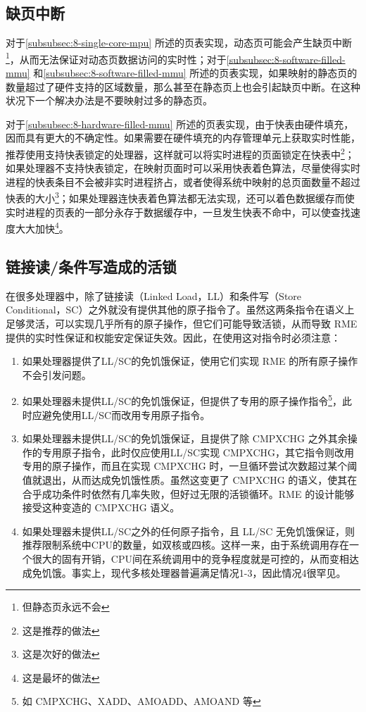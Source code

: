 \subsection{缺页中断}\label{subsec:9-page-faults}

对于\ref{subsubsec:8-single-core-mpu}
所述的页表实现，动态页可能会产生缺页中断\footnote{但静态页永远不会}，从而无法保证对动态页数据访问的实时性；对于\ref{subsubsec:8-software-filled-mmu}
和\ref{subsubsec:8-software-filled-mmu}
所述的页表实现，如果映射的静态页的数量超过了硬件支持的区域数量，那么甚至在静态页上也会引起缺页中断。在这种状况下一个解决办法是不要映射过多的静态页。

对于\ref{subsubsec:8-hardware-filled-mmu}
所述的页表实现，由于快表由硬件填充，因而具有更大的不确定性。如果需要在硬件填充的内存管理单元上获取实时性能，推荐使用支持快表锁定的处理器，这样就可以将实时进程的页面锁定在快表中\footnote{这是推荐的做法}；如果处理器不支持快表锁定，在映射页面时可以采用快表着色算法，尽量使得实时进程的快表条目不会被非实时进程挤占，或者使得系统中映射的总页面数量不超过快表的大小\footnote{这是次好的做法}；如果处理器连快表着色算法都无法实现，还可以着色数据缓存而使实时进程的页表的一部分永存于数据缓存中，一旦发生快表不命中，可以使查找速度大大加快\footnote{这是最坏的做法}。

\subsection{链接读/条件写造成的活锁}\label{subsec:9-ll-sc-livelock}

在很多处理器中，除了链接读（Linked Load，LL）和条件写（Store
Conditional，SC）之外就没有提供其他的原子指令了。虽然这两条指令在语义上足够灵活，可以实现几乎所有的原子操作，但它们可能导致活锁，从而导致 RME 提供的实时性保证和权能安定保证失效。因此，在使用这对指令时必须注意：

\begin{enumerate}
\def\labelenumi{\arabic{enumi}.}
\item
  如果处理器提供了LL/SC的免饥饿保证，使用它们实现 RME 的所有原子操作不会引发问题。
\item
  如果处理器未提供LL/SC的免饥饿保证，但提供了专用的原子操作指令\footnote{如 CMPXCHG、XADD、AMOADD、AMOAND 等}，此时应避免使用LL/SC而改用专用原子指令。
\item
  如果处理器未提供LL/SC的免饥饿保证，且提供了除 CMPXCHG 之外其余操作的专用原子指令，此时仅应使用LL/SC实现 CMPXCHG，其它指令则改用专用的原子操作，而且在实现 CMPXCHG 时，一旦循环尝试次数超过某个阈值就退出，从而达成免饥饿性质。虽然这变更了 CMPXCHG 的语义，使其在合乎成功条件时依然有几率失败，但好过无限的活锁循环。RME 的设计能够接受这种变造的 CMPXCHG 语义。
\item
  如果处理器未提供LL/SC之外的任何原子指令，且 LL/SC 无免饥饿保证，则推荐限制系统中CPU的数量，如双核或四核。这样一来，由于系统调用存在一个很大的固有开销，CPU间在系统调用中的竞争程度就是可控的，从而变相达成免饥饿。事实上，现代多核处理器普遍满足情况1-3，因此情况4很罕见。
\end{enumerate}

